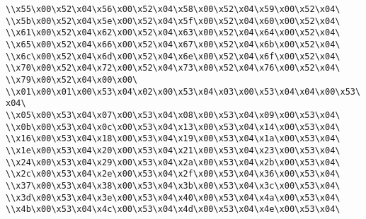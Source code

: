 \verb|\\x55\x00\x52\x04\x56\x00\x52\x04\x58\x00\x52\x04\x59\x00\x52\x04\|\newline
\verb|\\x5b\x00\x52\x04\x5e\x00\x52\x04\x5f\x00\x52\x04\x60\x00\x52\x04\|\newline
\verb|\\x61\x00\x52\x04\x62\x00\x52\x04\x63\x00\x52\x04\x64\x00\x52\x04\|\newline
\verb|\\x65\x00\x52\x04\x66\x00\x52\x04\x67\x00\x52\x04\x6b\x00\x52\x04\|\newline
\verb|\\x6c\x00\x52\x04\x6d\x00\x52\x04\x6e\x00\x52\x04\x6f\x00\x52\x04\|\newline
\verb|\\x70\x00\x52\x04\x72\x00\x52\x04\x73\x00\x52\x04\x76\x00\x52\x04\|\newline
\verb|\\x79\x00\x52\x04\x00\x00\|\newline
\verb|\\x01\x00\x01\x00\x53\x04\x02\x00\x53\x04\x03\x00\x53\x04\x04\x00\x53\x04\|\newline
\verb|\\x05\x00\x53\x04\x07\x00\x53\x04\x08\x00\x53\x04\x09\x00\x53\x04\|\newline
\verb|\\x0b\x00\x53\x04\x0c\x00\x53\x04\x13\x00\x53\x04\x14\x00\x53\x04\|\newline
\verb|\\x16\x00\x53\x04\x18\x00\x53\x04\x19\x00\x53\x04\x1a\x00\x53\x04\|\newline
\verb|\\x1e\x00\x53\x04\x20\x00\x53\x04\x21\x00\x53\x04\x23\x00\x53\x04\|\newline
\verb|\\x24\x00\x53\x04\x29\x00\x53\x04\x2a\x00\x53\x04\x2b\x00\x53\x04\|\newline
\verb|\\x2c\x00\x53\x04\x2e\x00\x53\x04\x2f\x00\x53\x04\x36\x00\x53\x04\|\newline
\verb|\\x37\x00\x53\x04\x38\x00\x53\x04\x3b\x00\x53\x04\x3c\x00\x53\x04\|\newline
\verb|\\x3d\x00\x53\x04\x3e\x00\x53\x04\x40\x00\x53\x04\x4a\x00\x53\x04\|\newline
\verb|\\x4b\x00\x53\x04\x4c\x00\x53\x04\x4d\x00\x53\x04\x4e\x00\x53\x04\|\newline
